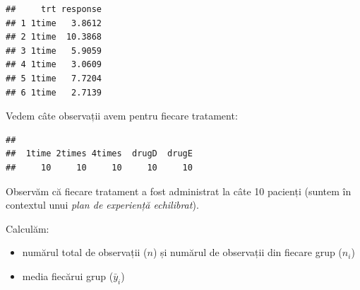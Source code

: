 \documentclass[]{article}
\newenvironment{Shaded}{\begin{snugshade}}{\end{snugshade}}
\newcommand{\KeywordTok}[1]{\textcolor[rgb]{0.13,0.29,0.53}{\textbf{{#1}}}}
\newcommand{\StringTok}[1]{\textcolor[rgb]{0.31,0.60,0.02}{{#1}}}
\newcommand{\CommentTok}[1]{\textcolor[rgb]{0.56,0.35,0.01}{\textit{{#1}}}}
\newcommand{\NormalTok}[1]{{#1}}
\providecommand{\tightlist}{%
  \setlength{\itemsep}{0pt}\setlength{\parskip}{0pt}}
\begin{document}
\begin{verbatim}
##     trt response
## 1 1time   3.8612
## 2 1time  10.3868
## 3 1time   5.9059
## 4 1time   3.0609
## 5 1time   7.7204
## 6 1time   2.7139
\end{verbatim}

Vedem câte observații avem pentru fiecare tratament:

\begin{Shaded}
\end{Shaded}

\begin{verbatim}
## 
##  1time 2times 4times  drugD  drugE 
##     10     10     10     10     10
\end{verbatim}

Observăm că fiecare tratament a fost administrat la câte 10 pacienți
(suntem în contextul unui \emph{plan de experiență echilibrat}).

Calculăm:

\begin{itemize}
\tightlist
\item
  numărul total de observații (\(n\)) și numărul de observații din
  fiecare grup (\(n_i\))
\end{itemize}

\begin{Shaded}
\end{Shaded}

\begin{itemize}
\tightlist
\item
  media fiecărui grup (\(\bar{y}_i\))
\end{itemize}

\begin{Shaded}
\end{Shaded}
\end{document}
